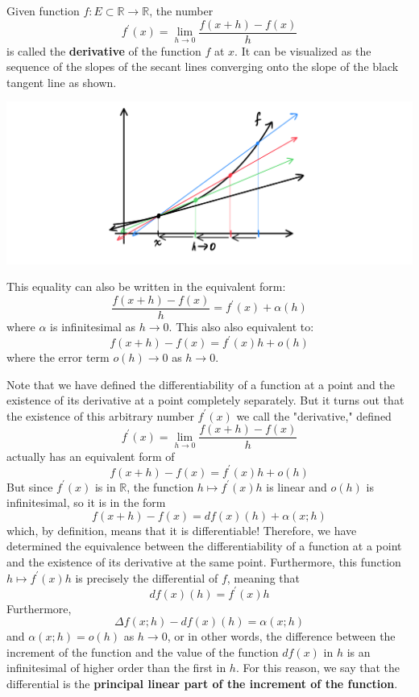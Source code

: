     \begin{definition}[Derivative]
      Given function $f: E \subset \mathbb{R} \longrightarrow \mathbb{R}$, the number
      \[f^\prime (x) = \lim_{h \rightarrow 0} \frac{f(x+h) - f(x)}{h}\]
      is called the \textbf{derivative} of the function $f$ at $x$. It can be visualized as the sequence of the slopes of the secant lines converging onto the slope of the black tangent line as shown. 
      \begin{center}
          \includegraphics[scale=0.27]{img/Tangent_Lines_Converging.PNG}
      \end{center}
      This equality can also be written in the equivalent form: 
      \[\frac{f(x+h) - f(x)}{h} = f^\prime (x) + \alpha (h)\]
      where $\alpha$ is infinitesimal as $h \rightarrow 0$. This also also equivalent to:
      \[f(x+h) - f(x) = f^\prime (x) h + o (h)\]
      where the error term $o(h) \rightarrow 0$ as $h \rightarrow 0$. 
    \end{definition}

    Note that we have defined the differentiability of a function at a point and the existence of its derivative at a point completely separately. But it turns out that the existence of this arbitrary number $f^\prime (x)$ we call the "derivative," defined
    \[f^\prime (x) = \lim_{h \rightarrow 0} \frac{f(x + h) - f(x)}{h}\]
    actually has an equivalent form of 
    \[f(x + h) - f(x) = f^\prime (x) h + o(h)\]
    But since $f^\prime(x)$ is in $\mathbb{R}$, the function $h \mapsto f^\prime (x) h$ is linear and $o(h)$ is infinitesimal, so it is in the form 
    \[f(x + h) - f(x) = df (x) (h) + \alpha(x; h)\]
    which, by definition, means that it is differentiable! Therefore, we have determined the equivalence between the differentiability of a function at a point and the existence of its derivative at the same point. Furthermore, this function $h \mapsto f^\prime (x) h$ is precisely the differential of $f$, meaning that
    \[df (x) (h) = f^\prime (x) h\]
    Furthermore, 
    \[\Delta f(x; h) - df(x)(h) = \alpha (x; h)\]
    and $\alpha(x;h) = o (h)$ as $h \rightarrow 0$, or in other words, the difference between the increment of the function and the value of the function $df(x)$ in $h$ is an infinitesimal of higher order than the first in $h$. For this reason, we say that the differential is the \textbf{principal linear part of the increment of the function}. 

